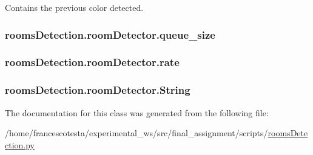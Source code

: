 Contains the previous color detected. 

\subsubsection[{\texorpdfstring{queue\+\_\+size}{queue_size}}]{\setlength{\rightskip}{0pt plus 5cm}rooms\+Detection.\+room\+Detector.\+queue\+\_\+size\hspace{0.3cm}{\ttfamily [static]}}\hypertarget{classroomsDetection_1_1roomDetector_a45ffd5583c2c5b9754964fb80a3baad2}{}\label{classroomsDetection_1_1roomDetector_a45ffd5583c2c5b9754964fb80a3baad2}
\subsubsection[{\texorpdfstring{rate}{rate}}]{\setlength{\rightskip}{0pt plus 5cm}rooms\+Detection.\+room\+Detector.\+rate\hspace{0.3cm}{\ttfamily [static]}}\hypertarget{classroomsDetection_1_1roomDetector_af9b73918d2c339e530129e12ad73fae2}{}\label{classroomsDetection_1_1roomDetector_af9b73918d2c339e530129e12ad73fae2}
\subsubsection[{\texorpdfstring{String}{String}}]{\setlength{\rightskip}{0pt plus 5cm}rooms\+Detection.\+room\+Detector.\+String\hspace{0.3cm}{\ttfamily [static]}}\hypertarget{classroomsDetection_1_1roomDetector_a2d4775447d05df098592bf322c457a03}{}\label{classroomsDetection_1_1roomDetector_a2d4775447d05df098592bf322c457a03}


The documentation for this class was generated from the following file\+:\begin{DoxyCompactItemize}
\item 
/home/francescotesta/experimental\+\_\+ws/src/final\+\_\+assignment/scripts/\hyperlink{roomsDetection_8py}{rooms\+Detection.\+py}\end{DoxyCompactItemize}
